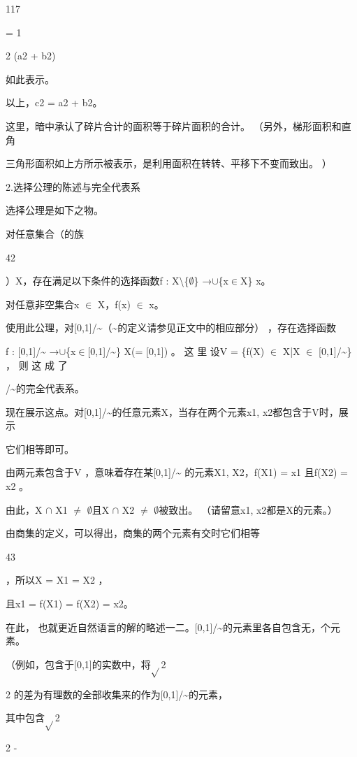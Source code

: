 117\par
= 1\par
2 (a2 + b2)\par
如此表示。\par
以上，c2 = a2 + b2。\par
这里，暗中承认了碎片合计的面积等于碎片面积的合计。 （另外，梯形面积和直角\par
三角形面积如上方所示被表示，是利用面积在转转、平移下不变而致出。 ）\par
2.选择公理的陈述与完全代表系\par
选择公理是如下之物。\par
对任意集合（的族\par
42\par
）X，存在满足以下条件的选择函数f : X\textbackslash{}\{$\emptyset$\} →$\cup$\{x$\in$X\} x。\par
对任意非空集合x $\in$ X，f(x) $\in$ x。\par
使用此公理，对[0,1]/\textasciitilde{}（\textasciitilde{}的定义请参见正文中的相应部分） ，存在选择函数\par
f : [0,1]/\textasciitilde{} →$\cup$\{x$\in$[0,1]/\textasciitilde{}\} X(= [0,1]) 。 这 里 设V = \{f(X) $\in$ X|X $\in$ [0,1]/\textasciitilde{}\} ， 则 这 成 了\par
[0,1]/\textasciitilde{}的完全代表系。\par
现在展示这点。对[0,1]/\textasciitilde{}的任意元素X，当存在两个元素x1, x2都包含于V时，展示\par
它们相等即可。\par
由两元素包含于V ，意味着存在某[0,1]/\textasciitilde{} 的元素X1, X2，f(X1) = x1 且f(X2) = x2 。\par
由此，X $\cap$ X1 $\neq$ $\emptyset$且X $\cap$ X2 $\neq$ $\emptyset$被致出。 （请留意x1, x2都是X的元素。）\par
由商集的定义，可以得出，商集的两个元素有交时它们相等\par
43\par
，所以X = X1 = X2 ，\par
且x1 = f(X1) = f(X2) = x2。\par
在此， 也就更近自然语言的解的略述一二。[0,1]/\textasciitilde{}的元素里各自包含无，个元素。\par
（例如，包含于[0,1]的实数中，将$\sqrt{}$2\par
2 的差为有理数的全部收集来的作为[0,1]/\textasciitilde{}的元素，\par
其中包含$\sqrt{}$2\par
2 -\par
